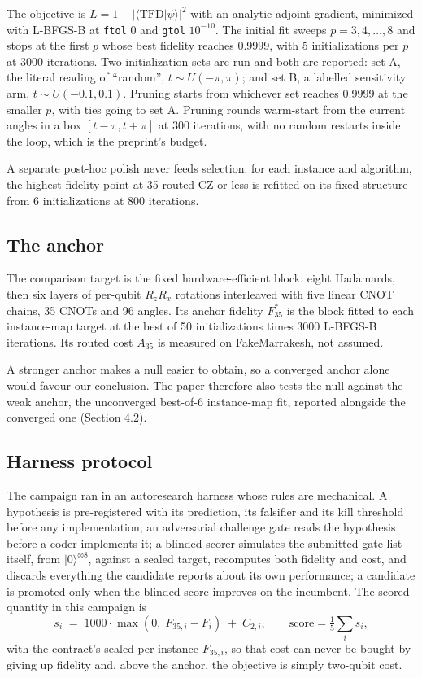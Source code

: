 \documentclass[11pt]{article}
\begin{document}
The objective is $L = 1 - |\langle \mathrm{TFD}|\psi\rangle|^2$ with an analytic adjoint gradient, minimized with L-BFGS-B \cite{byrd1995,scipy2020} at \texttt{ftol} 0 and \texttt{gtol} $10^{-10}$. The initial fit sweeps $p = 3,4,\dots,8$ and stops at the first $p$ whose best fidelity reaches 0.9999, with 5 initializations per $p$ at 3000 iterations. Two initialization sets are run and both are reported: set A, the literal reading of ``random'', $t \sim U(-\pi,\pi)$; and set B, a labelled sensitivity arm, $t \sim U(-0.1,0.1)$. Pruning starts from whichever set reaches 0.9999 at the smaller $p$, with ties going to set A. Pruning rounds warm-start from the current angles in a box $[t-\pi, t+\pi]$ at 300 iterations, with no random restarts inside the loop, which is the preprint's budget.

A separate post-hoc polish never feeds selection: for each instance and algorithm, the highest-fidelity point at 35 routed CZ or less is refitted on its fixed structure from 6 initializations at 800 iterations.

\subsection{The anchor}

The comparison target is the fixed hardware-efficient block: eight Hadamards, then six layers of per-qubit $R_z R_x$ rotations interleaved with five linear CNOT chains, 35 CNOTs and 96 angles. Its anchor fidelity $F_{35}^{*}$ is the block fitted to each instance-map target at the best of 50 initializations times 3000 L-BFGS-B iterations. Its routed cost $A_{35}$ is measured on FakeMarrakesh, not assumed.

A stronger anchor makes a null easier to obtain, so a converged anchor alone would favour our conclusion. The paper therefore also tests the null against the weak anchor, the unconverged best-of-6 instance-map fit, reported alongside the converged one (Section 4.2).

\subsection{Harness protocol}

The campaign ran in an autoresearch harness whose rules are mechanical. A hypothesis is pre-registered with its prediction, its falsifier and its kill threshold before any implementation; an adversarial challenge gate reads the hypothesis before a coder implements it; a blinded scorer simulates the submitted gate list itself, from $|0\rangle^{\otimes 8}$, against a sealed target, recomputes both fidelity and cost, and discards everything the candidate reports about its own performance; a candidate is promoted only when the blinded score improves on the incumbent. The scored quantity in this campaign is
\begin{equation}
s_i \;=\; 1000 \cdot \max\!\left(0,\; F_{35,i} - F_i\right) \;+\; C_{2,i}, \qquad \mathrm{score} = \tfrac{1}{5}\sum_i s_i ,
\label{eq:score}
\end{equation}
with the contract's sealed per-instance $F_{35,i}$, so that cost can never be bought by giving up fidelity and, above the anchor, the objective is simply two-qubit cost.
\end{document}
